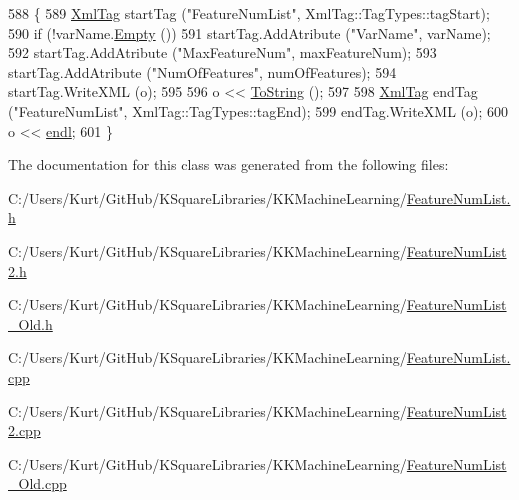 \begin{DoxyCode}
588 \{
589   \hyperlink{class_k_k_b_1_1_xml_tag}{XmlTag}  startTag (\textcolor{stringliteral}{"FeatureNumList"}, XmlTag::TagTypes::tagStart);
590   \textcolor{keywordflow}{if}  (!varName.\hyperlink{class_k_k_b_1_1_k_k_str_ac69942f73fffd672ec2a6e1c410afdb6}{Empty} ())
591     startTag.AddAtribute (\textcolor{stringliteral}{"VarName"}, varName);
592   startTag.AddAtribute (\textcolor{stringliteral}{"MaxFeatureNum"}, maxFeatureNum);
593   startTag.AddAtribute (\textcolor{stringliteral}{"NumOfFeatures"}, numOfFeatures);
594   startTag.WriteXML (o);
595 
596   o << \hyperlink{class_k_k_m_l_l_1_1_feature_num_list_ac96d441218dc767332fff806b0103bc3}{ToString} ();
597 
598   \hyperlink{class_k_k_b_1_1_xml_tag}{XmlTag}  endTag (\textcolor{stringliteral}{"FeatureNumList"}, XmlTag::TagTypes::tagEnd);
599   endTag.WriteXML (o);
600   o << \hyperlink{namespace_k_k_b_ad1f50f65af6adc8fa9e6f62d007818a8}{endl};
601 \}
\end{DoxyCode}


The documentation for this class was generated from the following files\+:\begin{DoxyCompactItemize}
\item 
C\+:/\+Users/\+Kurt/\+Git\+Hub/\+K\+Square\+Libraries/\+K\+K\+Machine\+Learning/\hyperlink{_feature_num_list_8h}{Feature\+Num\+List.\+h}\item 
C\+:/\+Users/\+Kurt/\+Git\+Hub/\+K\+Square\+Libraries/\+K\+K\+Machine\+Learning/\hyperlink{_feature_num_list2_8h}{Feature\+Num\+List2.\+h}\item 
C\+:/\+Users/\+Kurt/\+Git\+Hub/\+K\+Square\+Libraries/\+K\+K\+Machine\+Learning/\hyperlink{_feature_num_list___old_8h}{Feature\+Num\+List\+\_\+\+Old.\+h}\item 
C\+:/\+Users/\+Kurt/\+Git\+Hub/\+K\+Square\+Libraries/\+K\+K\+Machine\+Learning/\hyperlink{_feature_num_list_8cpp}{Feature\+Num\+List.\+cpp}\item 
C\+:/\+Users/\+Kurt/\+Git\+Hub/\+K\+Square\+Libraries/\+K\+K\+Machine\+Learning/\hyperlink{_feature_num_list2_8cpp}{Feature\+Num\+List2.\+cpp}\item 
C\+:/\+Users/\+Kurt/\+Git\+Hub/\+K\+Square\+Libraries/\+K\+K\+Machine\+Learning/\hyperlink{_feature_num_list___old_8cpp}{Feature\+Num\+List\+\_\+\+Old.\+cpp}\end{DoxyCompactItemize}
